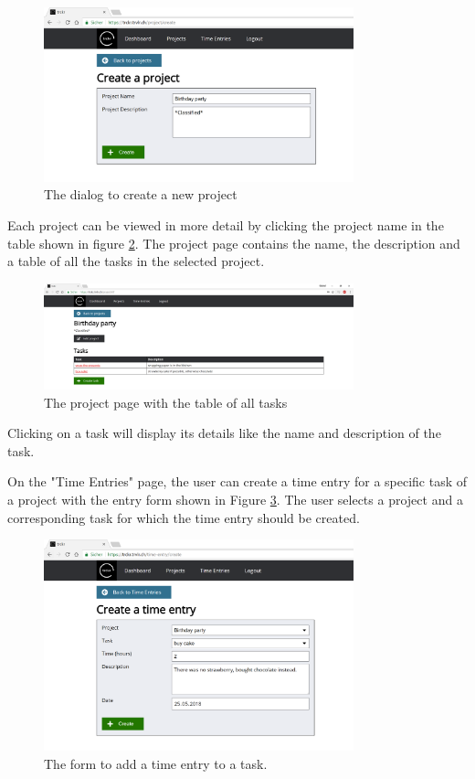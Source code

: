 \documentclass[bibliography=totoc, listof=totocnumbered]{scrartcl}
\begin{document}
\begin{figure}[h]
	\includegraphics[width=0.8\textwidth]{trckr-create-project}
	\caption{The dialog to create a new project}
	\label{fig:trckr-create-project}
\end{figure}


Each project can be viewed in more detail by clicking the project name in the
table shown in figure \ref{fig:trckr-project-page}. The project page contains
the name, the description and a table of all the tasks in the selected project.

\begin{figure}[h]
    \includegraphics[width=0.8\textwidth]{trckr-project-page}
    \caption{The project page with the table of all tasks}
    \label{fig:trckr-project-page}
\end{figure}

Clicking on a task will display its details like the name and description of
the task.

On the "Time Entries" page, the user can create a time entry for a specific task
of a project with the entry form shown in Figure
\ref{fig:trckr-create-time-entry}. The user selects a project and a corresponding
task for which the time entry should be created.

\begin{figure}[h]
    \includegraphics[width=0.8\textwidth]{trckr-create-time-entry}
    \caption{The form to add a time entry to a task.}
    \label{fig:trckr-create-time-entry}
\end{figure}
\end{document}
